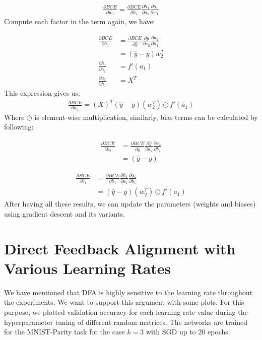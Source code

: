 \documentclass[a4paper, nobind]{templates/ociamthesis}
\begin{document}
\[
\begin{aligned} 
\frac{\partial BCE}{\partial w_{1}}=\frac{\partial BCE}{\partial h_1} \frac{\partial h_1}{\partial a_{1}} \frac{\partial a_{1}}{\partial w_{1}}
\end{aligned}
\]
Compute each factor in the term again, we have:

\[
\begin{aligned}
\frac{\partial BCE}{\partial h_1} &= \frac{\partial BCE}{\partial \hat{y}} \frac{\partial \hat{y}}{\partial a_{2}} \frac{\partial a_{2}}{\partial h_{1}}  \\
&= \left(\hat{y}-y\right) w_{2}^T \\
\frac{\partial h_1}{\partial a_{1}} &=f'(a_1) \\
\frac{\partial a_{1}}{\partial h_{1}} &=X^T
\end{aligned}
\]
This expression gives us:
\[
\begin{aligned}
\frac{\partial BCE}{\partial w_{1}}= \left(X\right)^T\left(\hat{y}-y\right)\left(w_{2}^T\right) \odot f'(a_1)
\end{aligned}
\]
Where \(\odot\) is element-wise multiplication, similarly, bias terms can be calculated by following:

\[
\begin{aligned} 
\frac{\partial BCE}{\partial b_{2}}&=\frac{\partial BCE}{\partial \hat{y}} \frac{\partial \hat{y}}{\partial a_{2}} \frac{\partial a_{2}}{\partial b_{2}} \\
&= \left(\hat{y}-y\right)
\end{aligned}
\]

\[
\begin{aligned} 
\frac{\partial BCE}{\partial b_{1}}&=\frac{\partial BCE}{\partial h_1} \frac{\partial h_1}{\partial a_{1}} \frac{\partial a_{1}}{\partial b_{1}} \\
&= \left(\hat{y}-y\right)\left(w_{2}^T\right) \odot f'(a_1)
\end{aligned}
\]
After having all these results, we can update the parameters (weights and biases) using gradient descent and its variants.

\hypertarget{direct-feedback-alignment-with-various-learning-rates}{%
\chapter{Direct Feedback Alignment with Various Learning Rates}\label{direct-feedback-alignment-with-various-learning-rates}}

We have mentioned that DFA is highly sensitive to the learning rate throughout the experiments. We want to support this argument with some plots. For this purpose, we plotted validation accuracy for each learning rate value during the hyperparameter tuning of different random matrices. The networks are trained for the MNIST-Parity task for the case \(k=3\) with SGD up to \(20\) epochs.
\end{document}
